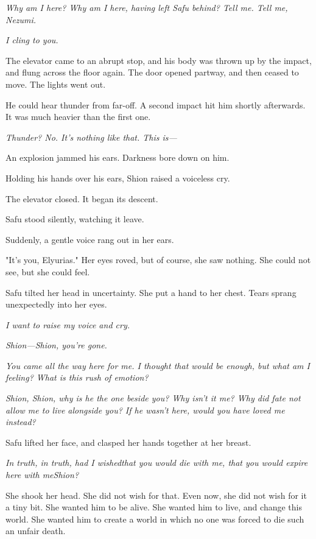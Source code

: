 \emph{Why am I here? Why am I here, having left Safu behind? Tell me. Tell me,
Nezumi.}

\emph{I cling to you.}

The elevator came to an abrupt stop, and his body was thrown up by the
impact, and flung across the floor again. The door opened partway, and
then ceased to move. The lights went out.

He could hear thunder from far-off. A second impact hit him shortly
afterwards. It was much heavier than the first one.

\emph{Thunder? No. It's nothing like that. This is---}

An explosion jammed his ears. Darkness bore down on him.

Holding his hands over his ears, Shion raised a voiceless cry.

The elevator closed. It began its descent.

Safu stood silently, watching it leave.

Suddenly, a gentle voice rang out in her ears.

"It's you, Elyurias." Her eyes roved, but of course, she saw nothing.
She could not see, but she could feel.


Safu tilted her head in uncertainty. She put a hand to her chest. Tears
sprang unexpectedly into her eyes.

\emph{I want to raise my voice and cry.}

\emph{Shion---Shion, you're gone.}

\emph{You came all the way here for me. I thought that would be enough, but
what am I feeling? What is this rush of emotion?}

\emph{Shion, Shion, why is he the one beside you? Why isn't it me? Why did
fate not allow me to live alongside you? If he wasn't here, would you
have loved me instead?}


Safu lifted her face, and clasped her hands together at her breast.


\emph{In truth, in truth, had I wished\el that you would die with me, that you
would expire here with me\el Shion?}

She shook her head. She did not wish for that. Even now, she did not
wish for it a tiny bit. She wanted him to be alive. She wanted him to
live, and change this world. She wanted him to create a world in which
no one was forced to die such an unfair death.

